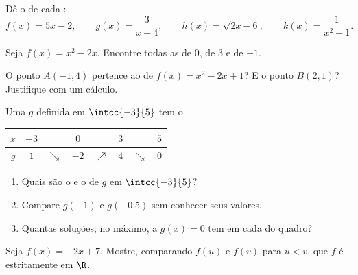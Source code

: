 \begin{exercise}[$\star$]\label{exo:g10:functions:2}
Dê o  de cada :
\[
f(x) = 5x - 2, \qquad
g(x) = \frac{3}{x + 4}, \qquad
h(x) = \sqrt{2x - 6}, \qquad
k(x) = \frac{1}{x^2 + 1}.
\]
\end{exercise}

\begin{exercise}[$\star$]\label{exo:g10:functions:3}
Seja $f(x) = x^2 - 2x$. Encontre todas as  de $0$, de $3$ e de
$-1$.
\end{exercise}

\begin{exercise}[$\star$]\label{exo:g10:functions:4}
O ponto $A(-1, 4)$ pertence ao  de $f(x) = x^2 - 2x + 1$? E o
ponto $B(2, 1)$? Justifique com um cálculo.
\end{exercise}

\begin{exercise}[$\star$]\label{exo:g10:functions:5}
Uma  $g$ definida em $\intcc{-3}{5}$ tem o 
\begin{center}
\renewcommand{\arraystretch}{1.3}
\begin{tabular}{c|ccccccc}
$x$ & $-3$ & & $0$ & & $3$ & & $5$ \\
\hline
$g$ & $1$ & $\searrow$ & $-2$ & $\nearrow$ & $4$ & $\searrow$ & $0$ \\
\end{tabular}
\end{center}
\begin{enumerate}
  \item Quais são o  e o  de $g$ em $\intcc{-3}{5}$?
  \item Compare $g(-1)$ e $g(-0.5)$ sem conhecer seus valores.
  \item Quantas soluções, no máximo, a  $g(x) = 0$ tem em cada
         do quadro?
\end{enumerate}
\end{exercise}

\begin{exercise}[$\star\star$]\label{exo:g10:functions:6}
Seja $f(x) = -2x + 7$. Mostre, comparando $f(u)$ e $f(v)$ para $u < v$,
que $f$ é estritamente  em $\R$.
\end{exercise}

